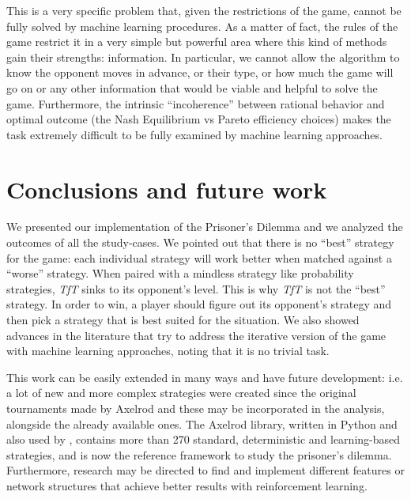 \documentclass[journal,10pt,twoside]{IEEEtran}
\begin{document}
This is a very specific problem that, given the restrictions of the game, cannot be fully solved by machine learning procedures. As a matter of fact, the rules of the game restrict it in a very simple but powerful area where this kind of methods gain their strengths: information. In particular, we cannot allow the algorithm to know the opponent moves in advance, or their type, or how much the game will go on or any other information that would be viable and helpful to solve the game. Furthermore, the intrinsic ``incoherence'' between rational behavior and optimal outcome (the Nash Equilibrium vs Pareto efficiency choices) makes the task extremely difficult to be fully examined by machine learning approaches.

\section{Conclusions and future work} \label{s:conc}
We presented our implementation of the Prisoner's Dilemma and we analyzed the outcomes of all the study-cases.
We pointed out that there is no ``best'' strategy for the game: each individual strategy will work better when matched against a ``worse'' strategy. When paired with a mindless strategy like probability strategies, \textit{TfT} sinks to its opponent's level. This is why \textit{TfT} is not the ``best'' strategy. In order to win, a player should figure out its opponent's strategy and then pick a strategy that is best suited for the situation.
We also showed advances in the literature that try to address the iterative version of the game with machine learning approaches, noting that it is no trivial task. 

This work can be easily extended in many ways and have future development: i.e. a lot of new and more complex strategies were created since the original tournaments made by Axelrod and these may be incorporated in the analysis, alongside the already available ones.
The Axelrod library, \cite{Knight2016Axel,axel-lib} written in Python and also used by \cite{plosRLdominant}, contains more than 270 standard, deterministic and learning-based strategies, and is now the reference framework to study the prisoner's dilemma.
Furthermore, research may be directed to find and implement different features or network structures that achieve better results with reinforcement learning.

\balance



\onecolumn
{} \label{s:appendix}
\end{document}
